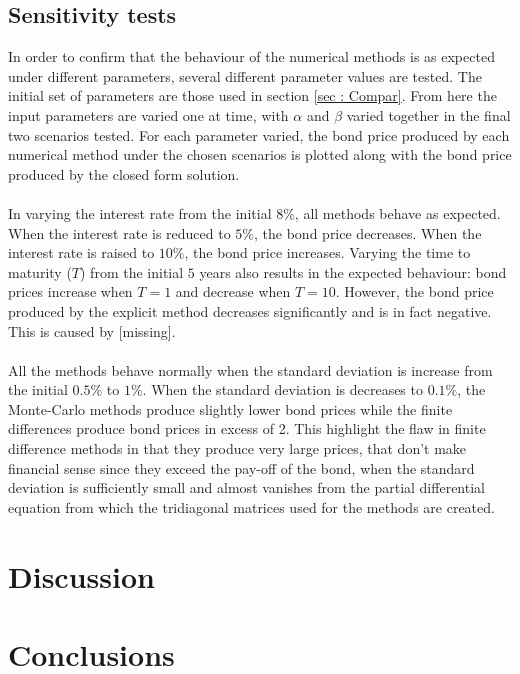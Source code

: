 \documentclass[12pt,a4paper]{article}
\begin{document}
\subsection{Sensitivity tests}
\label{subsec: Senses}
In order to confirm that the behaviour of the numerical methods is as expected under different parameters, several different parameter values are tested. The initial set of parameters are those used in section \ref{sec : Compar}. From here the input parameters are varied one at time, with $\alpha$ and $\beta$ varied together in the final two scenarios tested. For each parameter varied, the bond price produced by each numerical method under the chosen scenarios is plotted along with the bond price produced by the closed form solution.\\\\
In varying the interest rate from the initial $8\%$, all methods behave as expected. When the interest rate is reduced to $5\%$, the bond price decreases. When the interest rate is raised to $10\%$, the bond price increases.	Varying the time to maturity ($T$) from the initial $5$ years also results in the expected behaviour: bond prices increase when $T=1$ and decrease when $T=10$. However, the bond price produced by the explicit method decreases significantly and is in fact negative. This is caused by [missing].\\\\
All the methods behave normally when the standard deviation is increase from the initial $0.5\%$ to $1\%$. When the standard deviation is decreases to $0.1\%$, the Monte-Carlo methods produce slightly lower bond prices while the finite differences produce bond prices in excess of 2. This highlight the flaw in finite difference methods in that they produce very large prices, that don't make financial sense since they exceed the pay-off of the bond, when the standard deviation is sufficiently small and almost vanishes from the partial differential equation from which the tridiagonal matrices used for the methods are created.
	\newpage
	\section{Discussion}
	\label{sec: Discuss}
	
	\newpage
	\section{Conclusions}
	\label{sec : Concl}
	
\end{document}
